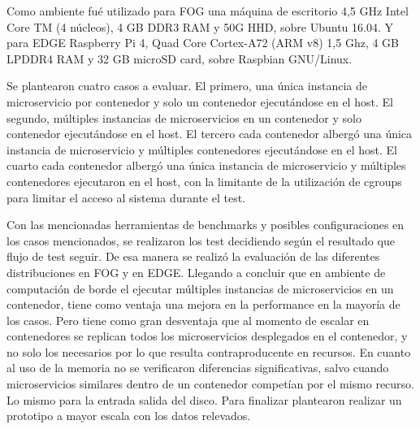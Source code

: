  Como ambiente fué utilizado para FOG una máquina de escritorio 4,5 GHz Intel Core TM (4 núcleos),
 4 GB DDR3 RAM y 50G HHD, sobre Ubuntu 16.04. Y para EDGE Raspberry Pi 4, Quad Core Cortex-A72 (ARM v8) 1,5 Ghz,
 4 GB LPDDR4 RAM y 32 GB microSD card, sobre Raspbian GNU/Linux. 
 
 Se plantearon cuatro casos a evaluar.
 El primero, una única instancia de microservicio por contenedor y solo un contenedor ejecutándose en el host.
 El segundo, múltiples instancias de microservicios en un contenedor y solo contenedor ejecutándose en el host. 
 El tercero cada contenedor albergó una única instancia de microservicio y múltiples contenedores ejecutándose en el host.
 El cuarto cada contenedor albergó una única instancia de microservicio y múltiples contenedores ejecutaron en el host, 
 con la limitante de la utilización de cgroups para limitar el acceso al sistema durante el test.

 Con las mencionadas herramientas de benchmarks y posibles configuraciones en los casos mencionados,
 se realizaron los test decidiendo según el resultado que flujo de test seguir.
 De esa manera se realizó la evaluación de las diferentes distribuciones en FOG y en EDGE. 
 Llegando a concluir que en ambiente de computación de borde el ejecutar múltiples instancias de microservicios en un contenedor,
 tiene como ventaja una mejora en la performance en la mayoría de los casos. 
 Pero tiene como gran desventaja que al momento de escalar en contenedores se replican todos los microservicios desplegados en el contenedor, 
 y no solo los necesarios por lo que resulta contraproducente en recursos. 
 En cuanto al uso de la memoria no se verificaron diferencias significativas, 
 salvo cuando microservicios similares dentro de un contenedor competían por el mismo recurso. 
 Lo mismo para la entrada salida del disco. Para finalizar plantearon realizar un prototipo a mayor escala con los datos relevados.
